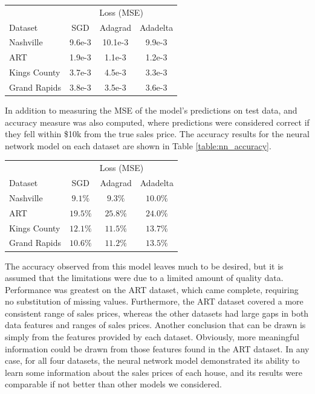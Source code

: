 \documentclass[10pt]{article}
\begin{document}
\begin{multicols}{2}
		\begin{center}
			\captionsetup{type=table}
			\begin{tabular}{l|c|c|c}
				& \multicolumn{3}{c}{Loss (MSE)} \\
				Dataset & SGD & Adagrad & Adadelta \\
				\hline
				Nashville & 9.6e-3 & 10.1e-3 & 9.9e-3 \\
				ART & 1.9e-3 & 1.1e-3 & 1.2e-3 \\
				Kings County & 3.7e-3 & 4.5e-3 & 3.3e-3 \\
				Grand Rapids & 3.8e-3 & 3.5e-3 & 3.6e-3 \\
			\end{tabular}
			\label{table:nn_performance}
		\end{center}
	
		In addition to measuring the MSE of the model's predictions on test data, and accuracy measure was also computed, where predictions were considered correct if they fell within \$10k from the true sales price. The accuracy results for the neural network model on each dataset are shown in Table \ref{table:nn_accuracy}.
		
		\begin{center}
		\captionsetup{type=table}
		\begin{tabular}{l|c|c|c}
			& \multicolumn{3}{c}{Loss (MSE)} \\
			Dataset & SGD & Adagrad & Adadelta \\
			\hline
			Nashville & \(9.1\%\) & \(9.3\%\) & \(10.0\%\) \\
			ART & \(19.5\%\) & \(25.8\%\) & \(24.0\%\) \\
			Kings County & \(12.1\%\) & \(11.5\%\) & \(13.7\%\) \\
			Grand Rapids & \(10.6\%\) & \(11.2\%\) & \(13.5\%\) \\
		\end{tabular}
		\label{table:nn_accuracy}
		\end{center}
		
		The accuracy observed from this model leaves much to be desired, but it is assumed that the limitations were due to a limited amount of quality data. Performance was greatest on the ART dataset, which came complete, requiring no substitution of missing values. Furthermore, the ART dataset covered a more consistent range of sales prices, whereas the other datasets had large gaps in both data features and ranges of sales prices. Another conclusion that can be drawn is simply from the features provided by each dataset. Obviously, more meaningful information could be drawn from those features found in the ART dataset. In any case, for all four datasets, the neural network model demonstrated its ability to learn some information about the sales prices of each house, and its results were comparable if not better than other models we considered.
		

\end{multicols}
\end{document}
